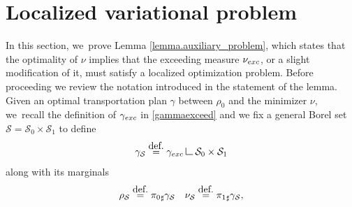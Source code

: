 \documentclass[11pt]{article}
\numberwithin{equation}{section}
\theoremstyle{definition}
\newcommand{\eqdef}{\ensuremath{\stackrel{\mbox{\upshape\tiny def.}}{=}}}
\newcommand\LM[1]{\hbox{\vrule width.5pt \vbox to#1pt{\vfill \hrule width#1pt height.5pt}}}
\newcommand\LL{{\mathchoice {\>\LM7\>}{\>\LM7\>}{\,\LM5\,}{\,\LM{3.35}\,}}}
\newcommand{\mres}{\LL}
\newcommand{\nuexc}{\nu_{\textup{exc}}}
\newcommand{\gammaexc}{\gamma_{\textup{exc}}}
\begin{document}
\appendix

\section{Localized variational problem}\label{appendix.localized_variational_problem}
In this section, we~prove Lemma \ref{lemma.auxiliary_problem}, which states that the optimality of $\nu$ implies that the exceeding measure $\nuexc$, or a slight modification of it, must satisfy a localized optimization problem. Before proceeding we review the notation introduced in the statement of the lemma. Given an optimal transportation plan $\gamma$ between $\rho_0$ and the minimizer $\nu$, we~recall the definition of $\gammaexc$ in \eqref{gammaexceed} and we fix a general Borel set $\mathcal{S} = \mathcal{S}_0 \times \mathcal{S}_1$ to define
\[
\gamma_{\mathcal{S}} \eqdef \gammaexc \mres \mathcal{S}_0\times\mathcal{S}_1
\]
along with its marginals
\[
\rho_{\mathcal{S}} \eqdef {\pi_{0}}_\sharp\gamma_\mathcal{S}
\quad \nu_{\mathcal{S}} \eqdef {\pi_{1}}_\sharp\gamma_{\mathcal{S}},
\]
\end{document}
